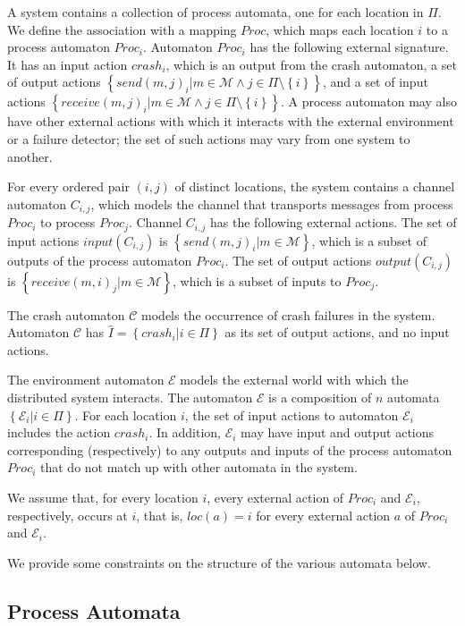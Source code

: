 \documentclass[11pt]{article}
\numberwithin{theorem}{section}
\newcommand{\set}[1]{\left\{#1\right\}}
\begin{document}
A system contains a collection of process automata, one for each
location in $\Pi$.
We define the association with a mapping $Proc$, which maps each
location $i$ to a process automaton $Proc_i$.
Automaton $Proc_i$ has the following external signature. 
It has an input action $crash_i$, which is an output from the crash
automaton,  
a set of output actions $\set{send(m,j)_i| m \in \mathcal{M} \wedge j
  \in \Pi \setminus \set{i}}$, 
and a set of input actions $\set{receive(m,j)_i| m \in
  \mathcal{M} \wedge j \in \Pi \setminus \set{i}}$.  
A process automaton may also have other external actions with which it
interacts with the external environment or a failure detector; the set
of such actions may vary from one system to another. 

For every ordered pair $(i,j)$ of distinct locations, the system
contains a channel automaton $C_{i,j}$, which models the channel that
transports messages from process $Proc_i$ to process $Proc_j$. 
Channel $C_{i,j}$ has the following external actions. 
The set of input actions $input(C_{i,j})$ is $\set{send(m,j)_i| m \in
  \mathcal{M}}$, which is a subset of outputs of the process automaton
$Proc_i$.
The set of output actions $output(C_{i,j})$ is $\set{receive(m,i)_j| m
  \in \mathcal{M}}$, which is a subset of inputs to $Proc_j$.

The crash automaton $\mathcal{C}$ models the occurrence of crash
failures in the system.
Automaton $\mathcal{C}$ has $\hat{I} = \set{crash_i | i \in \Pi}$ as
its set of output actions, and no input actions.

The environment automaton $\mathcal{E}$ models the external world with
which the distributed system interacts. The automaton $\mathcal{E}$ is a composition of $n$ automata $\set{\mathcal{E}_i | i \in\Pi}$.
For each location $i$, the set of input actions to automaton $\mathcal{E}_i$ includes the action $crash_i$.
In addition, $\mathcal{E}_i$ may have input and output actions corresponding
(respectively) to any outputs and inputs of the process automaton $Proc_i$ that
do not match up with other automata in the system.


We assume that, for every location $i$, every external action of
$Proc_i$ and $\mathcal{E}_i$, respectively, occurs at $i$, that is, $loc(a) = i$ for every external
action $a$ of $Proc_i$ and $\mathcal{E}_i$.

We provide some constraints on the structure of the various automata
below.

\subsection{Process Automata}
\label{subsec:processAutomata}
\end{document}
